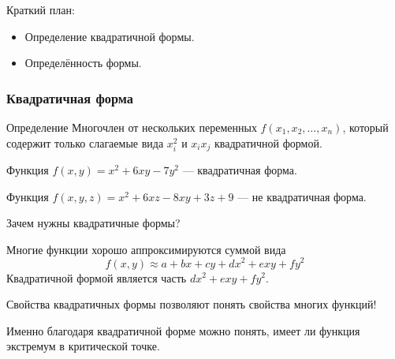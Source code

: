 
\begin{frame} %


\end{frame}



\begin{frame}{Краткий план:}
  \begin{itemize}[<+->]
    \item Определение квадратичной формы.
    \item Определённость формы.
  \end{itemize}

\end{frame}



\begin{frame}
    \frametitle{Квадратичная форма}    

    \begin{block}{Определение}
       Многочлен от нескольких переменных $f(x_1, x_2, \ldots, x_n)$, который содержит только слагаемые вида $x_i^2$ и $x_i x_j$ 
       \alert{квадратичной формой}.
    \end{block}

    \pause
    Функция $f(x,y) = x^2 + 6xy - 7y^2$ — квадратичная форма.

    \pause
    Функция $f(x, y, z) = x^2 + 6xz - 8xy + 3z + 9$ — не квадратичная форма. 
\end{frame}


\begin{frame}{Зачем нужны квадратичные формы?}
    
    Многие функции хорошо аппроксимируются суммой вида
    \[
    f(x, y) \approx a + b x + c y + d x^2 + e xy + f y^2 
    \]
    Квадратичной формой является часть $d x^2 + e xy + f y^2$. \pause


    Свойства квадратичных формы позволяют понять свойства многих функций! \pause

    Именно благодаря квадратичной форме можно понять, 
    имеет ли функция экстремум в критической точке. 
    
\end{frame}


